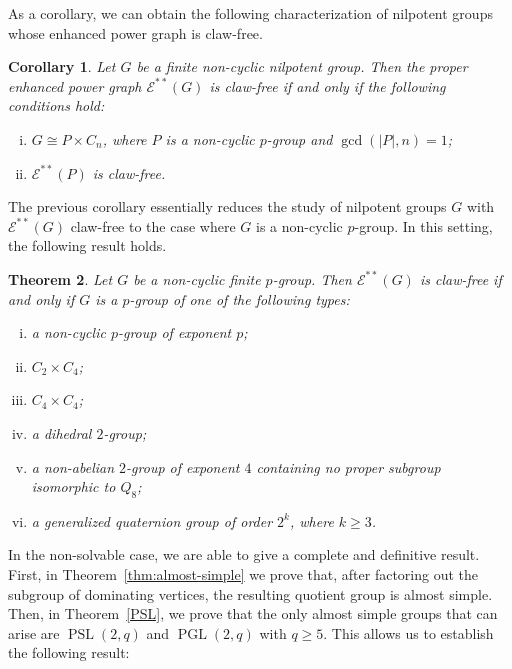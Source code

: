\documentclass[preprint,11pt]{elsarticle}
\newcommand{\PSL}{\operatorname{PSL}}
\newcommand{\PGL}{\operatorname{PGL}}
\newtheorem{theorem}{\bf Theorem}[section]
\newtheorem{corollary}[theorem]{\bf Corollary}
\begin{document}
As a corollary, we can obtain the following characterization of nilpotent groups whose enhanced power graph is claw-free.


\begin{corollary}\label{nilpotent}
Let $G$ be a finite non-cyclic nilpotent group. Then the proper enhanced power graph $\mathcal{E}^{**}(G)$ is claw-free if and only if the following conditions hold:
\begin{enumerate}[(i)]
\item $G \cong P \times C_n$, where $P$ is a non-cyclic $p$-group and $\gcd(|P|,n)=1$;
\item $\mathcal{E}^{**}(P)$ is claw-free.
\end{enumerate}
\end{corollary}

The previous corollary essentially reduces the study of nilpotent groups $G$ with $\mathcal{E}^{**}(G)$ claw-free to the case where $G$ is a non-cyclic $p$-group. In this setting, the following result holds.

\begin{theorem}\label{pgroups}
Let $G$ be a non-cyclic finite 
$p$-group. Then $\mathcal{E}^{**}(G)$ is claw-free if and only if $G$ is a $p$-group of one of the following types:
\begin{enumerate}[(i)]
\item a non-cyclic $p$-group of exponent $p$;
\item $C_{2}\times C_{4}$;
\item $C_{4}\times C_{4}$;
\item a dihedral $2$-group;
\item a non-abelian $2$-group of exponent $4$ containing no proper subgroup isomorphic to $Q_8$;
\item a generalized quaternion group of order $2^k$, where $k \geq 3$.
\end{enumerate}
\end{theorem}

In the non-solvable case, we are able to give a complete and definitive result. First, in Theorem~\ref{thm:almost-simple} we prove that, after factoring out the subgroup of dominating vertices, the resulting quotient group is almost simple. Then, in Theorem~\ref{PSL}, we prove that the only almost simple groups that can arise are $\PSL(2,q)$ and $\PGL(2,q)$ with $q\geq 5.$ This allows us to establish the following result:
\end{document}
